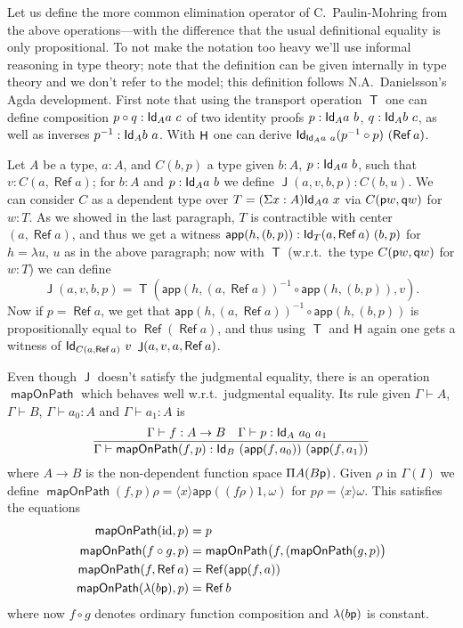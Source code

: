 \documentclass[10pt,a4paper]{article}
\DeclareMathOperator{\Ref}{\mathsf{Ref}}
\DeclareMathOperator{\Transp}{\mathsf{T}}
\DeclareMathOperator{\HH}{{\sf H}}
\DeclareMathOperator{\Jel}{\mathsf{J}}
\newcommand{\Id}{{\sf Id}}
\newcommand{\app}{\mathsf{app}}
\newcommand{\pp}{{\sf p}}
\newcommand{\qq}{{\sf q}}
\newcommand{\bind}[2]{{\langle}#1{\rangle}#2}
\DeclareMathOperator{\mapOnPath}{\mathsf{mapOnPath}}
\begin{document}
Let us define the more common elimination operator of C.\
Paulin-Mohring from the above operations---with the difference that
the usual definitional equality is only propositional.  To not make the
notation too heavy we'll use informal reasoning in type theory; note
that the definition can be given internally in type theory and we
don't refer to the model; this definition follows N.A.\ Danielsson's
Agda development.  First note that using the transport operation
$\Transp$ one can define composition $p \circ q : \Id_A a~c$ of two
identity proofs $p : \Id_A a~b$, $q : \Id_A b~c$, as well as inverses
$p^{-1} : \Id_A b~a$.  With $\HH$ one can derive $\Id_{\Id_A a~a}
(p^{-1} \circ p)~(\Ref a)$.

Let $A$ be a type, $a : A$, and $C (b,p)$ a type given $b : A$, $p :
\Id_A a~b$, such that $v : C (a, \Ref a)$; for $b : A$ and $p :
\Id_{A} a~b$ we define $\Jel (a,v,b,p) : C (b,u)$.  We can consider
$C$ as a dependent type over $T = (\Sigma x : A) \Id_A a~x$ via $C
(\pp w, \qq w)$ for $w : T$.  As we showed in the last paragraph, $T$
is contractible with center $(a, \Ref a)$, and thus we get a witness
$\app (h, (b,p)) : \Id_T (a,\Ref a)~(b,p)$ for $h = \lambda u$, $u$ as
in the above paragraph; now with $\Transp$ (w.r.t.\ the type $C (\pp
w, \qq w)$ for $w : T$) we can define
\[
\Jel (a,v,b,p) = \Transp (\app (h, (a,\Ref a))^{-1} \circ \app
(h,(b,p)), v).
\]
Now if $p = \Ref a$, we get that $\app (h, (a,\Ref a))^{-1} \circ \app
(h,(b,p))$ is propositionally equal to $\Ref (\Ref a)$, and thus using
$\Transp$ and $\HH$ again one gets a witness of $\Id_{C (a, \Ref a)}~
v~\Jel (a,v,a,\Ref a)$.

Even though $\Jel$ doesn't satisfy the judgmental equality, there is
an operation $\mapOnPath$ which behaves well w.r.t.\ judgmental
equality.  Its rule given $\Gamma \vdash A$, $\Gamma \vdash B$,
$\Gamma \vdash a_0 : A$ and $\Gamma \vdash a_1 : A$ is
\[
\frac {\quad \Gamma \vdash f : A \to B \quad \Gamma \vdash p :
  \Id_A~a_0~a_1} {\Gamma \vdash \mapOnPath (f, p) : \Id_B~(\app
  (f,a_0))~(\app (f,a_1))}
\]
where $A \to B$ is the non-dependent function space $\Pi A (B \pp)$.
Given $\rho$ in $\Gamma (I)$ we define $\mapOnPath (f, p) \rho =
\bind{x} \app ((f \rho) 1, \omega)$ for $p \rho = \bind x \omega$.
This satisfies the equations
\begin{align*}
  \mapOnPath (\mathrm{id}, p) & = p \\
  \mapOnPath (f \circ g, p) &= \mapOnPath \bigl( f, (\mapOnPath
  (g, p) \bigr)\\
  \mapOnPath (f, \Ref a) &= \Ref (\app (f, a))\\
  \mapOnPath (\lambda (b \pp), p) &= \Ref b
\end{align*}
where now $f \circ g$ denotes ordinary function composition and
$\lambda (b \pp)$ is constant.
\end{document}
